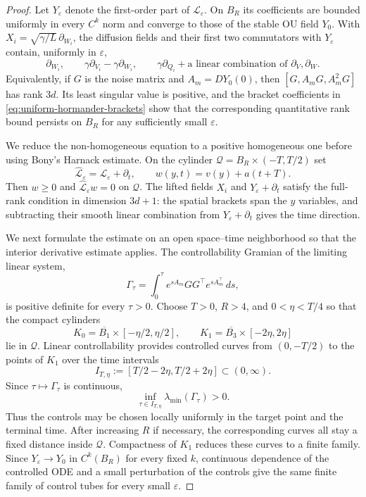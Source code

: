 \documentclass[11pt]{article}
\numberwithin{equation}{section}
\theoremstyle{plain}
\theoremstyle{definition}
\theoremstyle{remark}
\newcommand{\eps}{\varepsilon}
\begin{document}
\begin{proof}
Let $Y_\eps$ denote the first-order part of $\mathscr L_\eps$.  On $B_R$ its
coefficients are bounded uniformly in every $C^k$ norm and converge to those
of the stable OU field $Y_0$.  With $X_i=\sqrt{\gamma/L}\,\partial_{W_i}$,
the diffusion fields and their first two commutators with $Y_\eps$ contain,
uniformly in $\eps$,
\begin{equation}
\label{eq:uniform-hormander-brackets}
\partial_{W_i},\qquad
\gamma\partial_{V_i}-\gamma\partial_{W_i},\qquad
\gamma\partial_{Q_i}+\text{a linear combination of }\partial_V,\partial_W.
\end{equation}
Equivalently, if $G$ is the noise matrix and $A_m=DY_0(0)$, then
$[G,A_mG,A_m^2G]$ has rank $3d$.  Its least singular value is positive, and
the bracket coefficients in
\eqref{eq:uniform-hormander-brackets}  show that the corresponding quantitative
rank bound persists on $B_R$ for any sufficiently small $\eps$.

We reduce the non-homogeneous equation to a positive homogeneous one before
using Bony's Harnack estimate.  On the cylinder
$\mathcal Q=B_R\times(-T,T/2)$ set
\[
\widehat{\mathscr L}_\eps=\mathscr L_\eps+\partial_t,
\qquad
w(y,t)=v(y)+a(t+T).
\]
Then $w\ge0$ and $\widehat{\mathscr L}_\eps w=0$ on $\mathcal Q$.  The lifted
fields $X_i$ and $Y_\eps+\partial_t$ satisfy the full-rank condition in
dimension $3d+1$: the spatial brackets span the $y$ variables, and subtracting
their smooth linear combination from $Y_\eps+\partial_t$ gives the time
direction.

We next formulate the estimate on an open space--time neighborhood so that
the interior derivative estimate applies.  The
controllability Gramian of the limiting linear system,
\[
  \Gamma_\tau=\int_0^\tau e^{sA_m}GG^\top e^{sA_m^\top}\,ds,
\]
is positive definite for every $\tau>0$.  Choose $T>0$, $R>4$, and
$0<\eta<T/4$ so that
the compact cylinders
\[
 K_0=\overline{B_1}\times[-\eta/2,\eta/2],
 \qquad K_1=\overline{B_3}\times[-2\eta,2\eta]
\]
lie in $\mathcal Q$.  Linear controllability provides controlled curves from
$(0,-T/2)$ to the points of $K_1$ over the time intervals
\[
I_{T,\eta}
:=\left[T/2-2\eta,T/2+2\eta\right]\subset(0,\infty).
\]
Since $\tau\mapsto\Gamma_\tau$ is continuous,
\[
\inf_{\tau\in I_{T,\eta}}
\lambda_{\min}(\Gamma_\tau)>0.
\]
Thus the controls may be chosen locally uniformly in the target point and
the terminal time.  After increasing $R$ if necessary, the corresponding
curves all stay a fixed
distance inside $\mathcal Q$.  Compactness of $K_1$ reduces these curves to a
finite family.  Since $Y_\eps\to Y_0$ in $C^k(B_R)$ for every fixed $k$,
continuous dependence of the controlled ODE and a small perturbation of the
controls give the same finite family of control tubes for every small $\eps$.


\end{proof}
\end{document}
